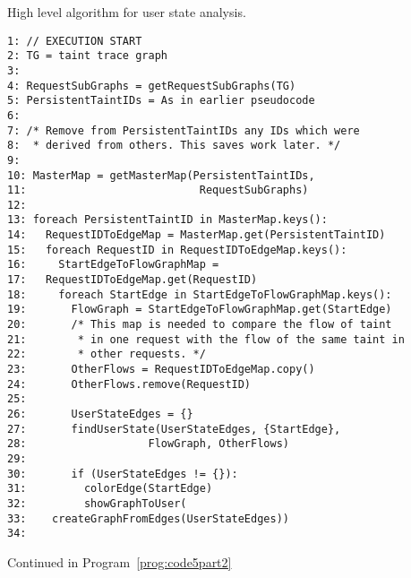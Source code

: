 \documentclass[msc,oneside]{ubcthesis}
\begin{document}
\begin{Program}
  \caption{\label{prog:code5} High level algorithm for user state analysis.}
\begin{verbatim}
1: // EXECUTION START
2: TG = taint trace graph
3: 
4: RequestSubGraphs = getRequestSubGraphs(TG)
5: PersistentTaintIDs = As in earlier pseudocode
6: 
7: /* Remove from PersistentTaintIDs any IDs which were 
8:  * derived from others. This saves work later. */
9: 
10: MasterMap = getMasterMap(PersistentTaintIDs, 
11:                           RequestSubGraphs)
12: 
13: foreach PersistentTaintID in MasterMap.keys():
14:   RequestIDToEdgeMap = MasterMap.get(PersistentTaintID)
15:   foreach RequestID in RequestIDToEdgeMap.keys():
16:     StartEdgeToFlowGraphMap = 
17:   RequestIDToEdgeMap.get(RequestID) 
18:     foreach StartEdge in StartEdgeToFlowGraphMap.keys():
19:       FlowGraph = StartEdgeToFlowGraphMap.get(StartEdge)
20:       /* This map is needed to compare the flow of taint 
21:        * in one request with the flow of the same taint in
22:        * other requests. */
23:       OtherFlows = RequestIDToEdgeMap.copy()
24:       OtherFlows.remove(RequestID)
25:       
26:       UserStateEdges = {}
27:       findUserState(UserStateEdges, {StartEdge}, 
28:                   FlowGraph, OtherFlows)
29:       
30:       if (UserStateEdges != {}):
31:         colorEdge(StartEdge)
32:         showGraphToUser(
33:    createGraphFromEdges(UserStateEdges))  
34: 
\end{verbatim}
Continued in Program~\ref{prog:code5part2}
\end{Program}
\end{document}
